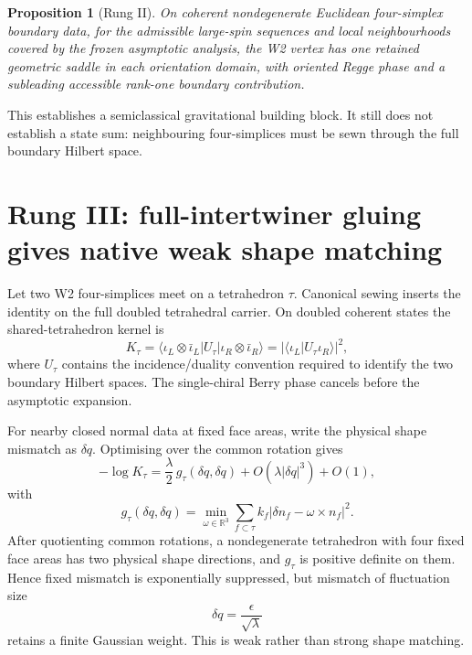 \documentclass[11pt]{article}
\numberwithin{equation}{section}
\newtheorem{proposition}[theorem]{Proposition}
\begin{document}
\begin{proposition}[Rung II]
On coherent nondegenerate Euclidean four-simplex boundary data, for the admissible large-spin sequences and local neighbourhoods covered by the frozen asymptotic analysis, the W2 vertex has one retained geometric saddle in each orientation domain, with oriented Regge phase and a subleading accessible rank-one boundary contribution.
\end{proposition}

This establishes a semiclassical gravitational building block. It still does not establish a state sum: neighbouring four-simplices must be sewn through the full boundary Hilbert space.

\section{Rung III: full-intertwiner gluing gives native weak shape matching}\label{sec:r3}

Let two W2 four-simplices meet on a tetrahedron $\tau$. Canonical sewing inserts the identity on the full doubled tetrahedral carrier. On doubled coherent states the shared-tetrahedron kernel is
\begin{equation}\label{eq:edgekernel}
  K_\tau
  =\langle\iota_L\otimes\bar\iota_L|U_\tau|
  \iota_R\otimes\bar\iota_R\rangle
  =\left|\langle\iota_L|U_\tau\iota_R\rangle\right|^2,
\end{equation}
where $U_\tau$ contains the incidence/duality convention required to identify the two boundary Hilbert spaces. The single-chiral Berry phase cancels before the asymptotic expansion.

For nearby closed normal data at fixed face areas, write the physical shape mismatch as $\delta q$. Optimising over the common rotation gives
\begin{equation}\label{eq:gluemetric}
  -\log K_\tau
  = \frac{\lambda}{2}\,g_\tau(\delta q,\delta q)
  +O(\lambda|\delta q|^3)+O(1),
\end{equation}
with
\begin{equation}
  g_\tau(\delta q,\delta q)
  =\min_{\omega\in\mathbb R^3}
  \sum_{f\subset\tau} k_f
  |\delta n_f-\omega\times n_f|^2.
\end{equation}
After quotienting common rotations, a nondegenerate tetrahedron with four fixed face areas has two physical shape directions, and $g_\tau$ is positive definite on them. Hence fixed mismatch is exponentially suppressed, but mismatch of fluctuation size
\begin{equation}
  \delta q=\frac{\epsilon}{\sqrt\lambda}
\end{equation}
retains a finite Gaussian weight. This is weak rather than strong shape matching.
\end{document}
